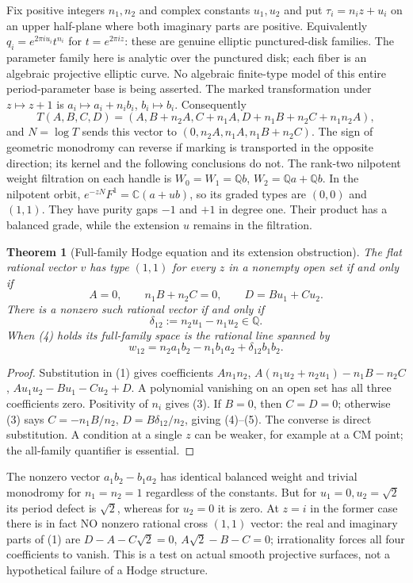 \documentclass[11pt]{article}
\newtheorem{theorem}{Theorem}
\newcommand{\Q}{\mathbb Q}
\newcommand{\C}{\mathbb C}
\begin{document}
Fix positive integers $n_1,n_2$ and complex constants $u_1,u_2$ and put
$\tau_i=n_i z+u_i$ on an upper half-plane where both imaginary parts
are positive. Equivalently $q_i=e^{2\pi i u_i}t^{n_i}$ for
$t=e^{2\pi i z}$: these are genuine elliptic punctured-disk families.
The parameter family here is analytic over the punctured disk; each fiber
is an algebraic projective elliptic curve. No algebraic finite-type model
of this entire period-parameter base is being asserted.
The marked transformation under $z\mapsto z+1$ is $a_i\mapsto a_i+n_i b_i$,
$b_i\mapsto b_i$. Consequently
\[
 T(A,B,C,D)=(A,B+n_2A,C+n_1A,D+n_1B+n_2C+n_1n_2A),\tag{2}
\]
and $N=\log T$ sends this vector to $(0,n_2A,n_1A,n_1B+n_2C)$.
The sign of geometric monodromy can reverse if marking is transported in
the opposite direction; its kernel and the following conclusions do not.
The rank-two nilpotent weight filtration on each handle is
$W_0=W_1=\Q b$, $W_2=\Q a+\Q b$. In the nilpotent orbit,
$e^{-zN}F^1=\C(a+u b)$, so its graded types are $(0,0)$ and $(1,1)$.
They have purity gaps $-1$ and $+1$ in degree one. Their product has a
balanced grade, while the extension $u$ remains in the filtration.

\begin{theorem}[Full-family Hodge equation and its extension obstruction]
The flat rational vector $v$ has type $(1,1)$ for every $z$ in a nonempty
open set if and only if
\[
 A=0,\qquad n_1B+n_2C=0,\qquad D=Bu_1+Cu_2.\tag{3}
\]
There is a nonzero such rational vector if and only if
\[
 \delta_{12}:=n_2u_1-n_1u_2\in\Q.\tag{4}
\]
When (4) holds its full-family space is the rational line spanned by
\[
 w_{12}=n_2a_1b_2-n_1b_1a_2+\delta_{12}b_1b_2.\tag{5}
\]
\end{theorem}
\begin{proof}
Substitution in (1) gives coefficients
$An_1n_2$, $A(n_1u_2+n_2u_1)-n_1B-n_2C$,
$Au_1u_2-Bu_1-Cu_2+D$. A polynomial vanishing on an open set has
all three coefficients zero. Positivity of $n_i$ gives (3).
If $B=0$, then $C=D=0$; otherwise (3) says
$C=-n_1B/n_2$, $D=B\delta_{12}/n_2$, giving (4)--(5).
The converse is direct substitution. A condition at a single $z$ can be
weaker, for example at a CM point; the all-family quantifier is essential.
\end{proof}

The nonzero vector $a_1b_2-b_1a_2$ has identical balanced weight and
trivial monodromy for $n_1=n_2=1$ regardless of the constants. But for
$u_1=0,u_2=\sqrt2$ its period defect is $\sqrt2$, whereas for $u_2=0$
it is zero. At $z=i$ in the former case there is in fact NO nonzero
rational cross $(1,1)$ vector: the real and imaginary parts of (1) are
$D-A-C\sqrt2=0$, $A\sqrt2-B-C=0$; irrationality forces all four
coefficients to vanish. This is a test on actual smooth projective
surfaces, not a hypothetical failure of a Hodge structure.
\end{document}
